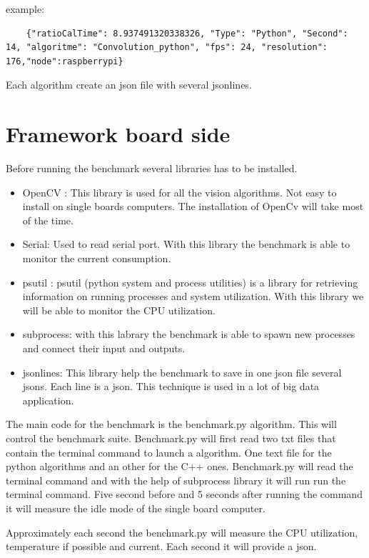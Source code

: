 \documentclass[english]{book_template} %
\begin{document}
example: 
	\begin{lstlisting}
	{"ratioCalTime": 8.937491320338326, "Type": "Python", "Second": 14, "algoritme": "Convolution_python", "fps": 24, "resolution": 176,"node":raspberrypi}
	\end{lstlisting}
   
Each algorithm create an json file with several jsonlines. 
  
\section{Framework board side}
Before running the benchmark several libraries has to be installed. 
\begin{itemize}
\item OpenCV : This library is used for all the vision algorithms. Not easy to install on single boards computers. The installation of OpenCv will take most of the time. 
\item Serial: Used to read serial port. With this library the benchmark is able to monitor the current consumption.
\item psutil : psutil (python system and process utilities) is a library for retrieving information on running processes and system utilization. With this library we will be able to monitor the CPU utilization.  %
\item subprocess: with this labrary the benchmark is able to spawn new processes and connect their input and outputs. 
\item jsonlines: This library help the benchmark to save in one json file several jsons. Each line is a json. This technique is used in a lot of big data application.
\end{itemize}

The main code for the benchmark is the benchmark.py algorithm. This will control the benchmark suite. Benchmark.py will first read two txt files that contain the terminal command to launch a algorithm. One text file for the python algorithms and an other for the C++ ones.
Benchmark.py will read the terminal command and with the help of subprocess library it will run run the terminal command. Five second before and 5 seconds after running the command it will measure the idle mode of the single board computer.

Approximately each second the benchmark.py will measure the CPU utilization, temperature if possible and current. Each second it will provide a json. 
\end{document}
